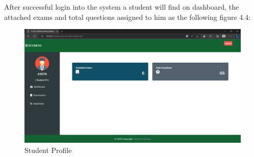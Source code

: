 After successful login into the system a student will find on dashboard, the attached exams and total questions assigned to him as the following figure 4.4:
\begin{figure}[H]
    \centering
    \includegraphics[scale=.35]{img/studentd.png}
    \caption{Student Profile}
    \label{fig:studentd}
\end{figure}

